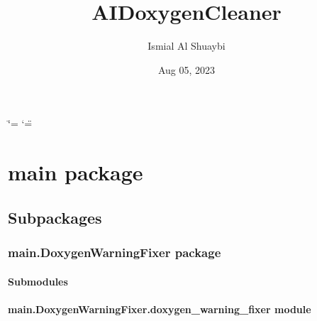 \documentclass[letterpaper,10pt,english]{sphinxmanual}
\title{AI\sphinxhyphen{}DoxygenCleaner}
\date{Aug 05, 2023}
\author{Ismial Al Shuaybi}
\begin{document}
\ifdefined\shorthandoff
  \ifnum\catcode`\=\string=\active\shorthandoff{=}\fi
  \ifnum\catcode`\"=\active{}\fi
\fi

\pagestyle{empty}
\sphinxmaketitle
\pagestyle{plain}
\sphinxtableofcontents
\pagestyle{normal}
\label{\detokenize{index::doc}}


\sphinxstepscope


\chapter{main package}
\label{\detokenize{main:main-package}}\label{\detokenize{main::doc}}

\section{Subpackages}
\label{\detokenize{main:subpackages}}
\sphinxstepscope


\subsection{main.DoxygenWarningFixer package}
\label{\detokenize{main.DoxygenWarningFixer:main-doxygenwarningfixer-package}}\label{\detokenize{main.DoxygenWarningFixer::doc}}

\subsubsection{Submodules}
\label{\detokenize{main.DoxygenWarningFixer:submodules}}

\subsubsection{main.DoxygenWarningFixer.doxygen\_warning\_fixer module}
\label{\detokenize{main.DoxygenWarningFixer:module-main.DoxygenWarningFixer.doxygen_warning_fixer}}\label{\detokenize{main.DoxygenWarningFixer:main-doxygenwarningfixer-doxygen-warning-fixer-module}}
\end{document}
